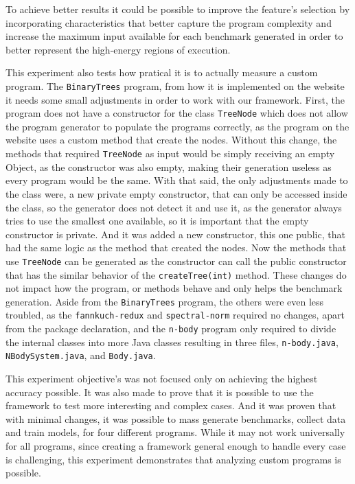 To achieve better results it could be possible to improve the feature's selection by incorporating characteristics that better capture the program complexity and increase the maximum input available for each benchmark generated in order to better represent the high-energy regions of execution.


This experiment also tests how pratical it is to actually measure a custom program. 
The \texttt{BinaryTrees} program, from how it is implemented on the website it needs some small adjustments in order to work with our framework. First, the program does not have a constructor for the class \texttt{TreeNode} which does not allow the program generator to populate the programs correctly, as the program on the website uses a custom method that create the nodes. Without this change, the methods that required \texttt{TreeNode} as input would be simply receiving an empty Object, as the constructor was also empty, making their generation useless as every program would be the same.
With that said, the only adjustments made to the class were, a new private empty constructor, that can only be accessed inside the class, so the generator does not detect it and use it, as the generator always tries to use the smallest one available, so it is important that the empty constructor is private. And it was added a new constructor, this one public, that had the same logic as the method that created the nodes. Now the methods that use \texttt{TreeNode} can be generated as the constructor can call the public constructor that has the similar behavior of the \texttt{createTree(int)} method. These changes do not impact how the program, or methods behave and only helps the benchmark generation.
Aside from the \texttt{BinaryTrees} program, the others were even less troubled, as the \texttt{fannkuch-redux} and \texttt{spectral-norm} required no changes, apart from the package declaration, and the \texttt{n-body} program only required to divide the internal classes into more Java classes resulting in three files, \texttt{n-body.java}, \texttt{NBodySystem.java}, and \texttt{Body.java}.


This experiment objective's was not focused only on achieving the highest accuracy possible. It was also made to prove that it is possible to use the framework to test more interesting and complex cases. And it was proven that with minimal changes, it was possible to mass generate benchmarks, collect data and train models, for four different programs. While it may not work universally for all programs, since creating a framework general enough to handle every case is challenging, this experiment demonstrates that analyzing custom programs is possible.


